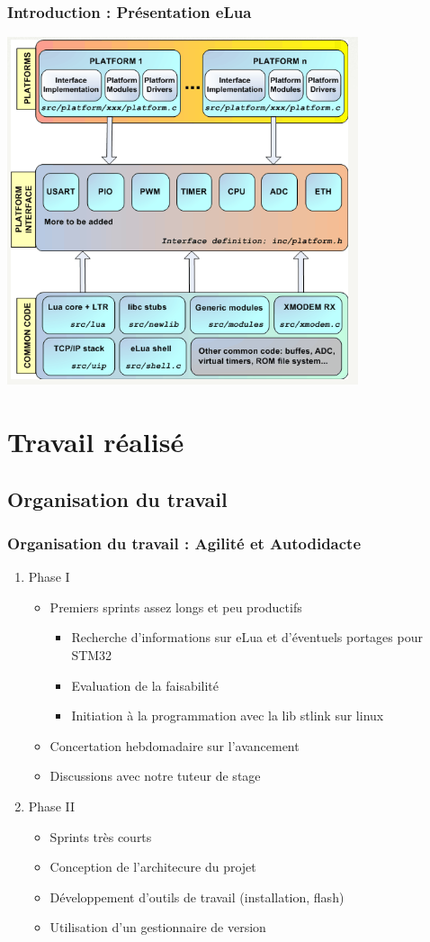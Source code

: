 \documentclass{beamer}
\begin{document}
\begin{frame}
\frametitle{Introduction : Présentation eLua}
\begin{center}
 \includegraphics[scale=0.55]{../images/eLua/schema.png}
\end{center}
\end{frame}

\section{Travail réalisé}
\subsection{Organisation du travail}
\begin{frame}
\frametitle{Organisation du travail : Agilité et Autodidacte}
\begin{enumerate}
 \item Phase I
\begin{itemize}
\item Premiers sprints assez longs et peu productifs
\begin{itemize}
\item Recherche d'informations sur eLua et d'éventuels portages pour STM32
\item Evaluation de la faisabilité
\item Initiation à la programmation avec la lib stlink sur linux
\end{itemize}
\item Concertation hebdomadaire sur l'avancement
\item Discussions avec notre tuteur de stage
\end{itemize}
 \item Phase II
\begin{itemize}
\item Sprints très courts
\item Conception de l'architecure du projet
\item Développement d'outils de travail (installation, flash)
\item Utilisation d'un gestionnaire de version
\end{itemize}
\end{enumerate}
\end{frame}
\end{document}
